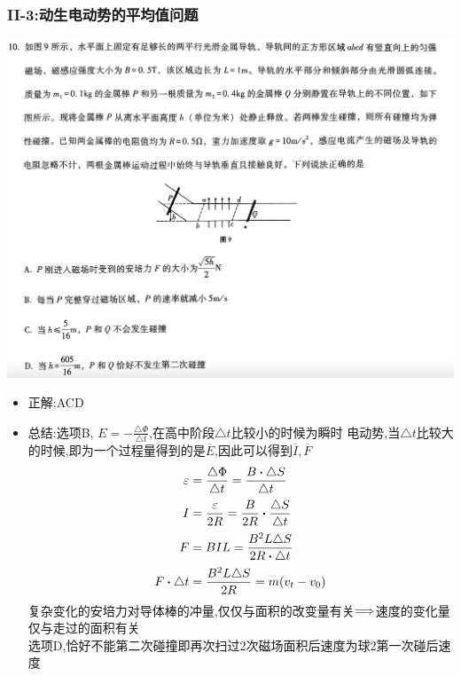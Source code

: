 \documentclass{article}
\begin{document}
\subsubsection{II-3:动生电动势的平均值问题}
\includegraphics[width=50em,keepaspectratio]{./pictures/3.1-3.png}

\begin{itemize}
    \item 正解:\quad ACD
    \item 总结:\quad 选项B, $E = - \frac{\triangle \Phi}{\triangle t}$,在高中阶段$\triangle t$比较小的时候为瞬时
          电动势,当$\triangle t$比较大的时候,即为一个过程量得到的是$\overline{E}$,因此可以得到$\overline{I},\overline{F}$
          \begin{align*}
              \varepsilon         & = \frac{\triangle \Phi}{\triangle t} = \frac{B \vdot \triangle S}{\triangle t} \\
              I                   & = \frac{\varepsilon}{2R} = \frac{B}{2R} \vdot \frac{\triangle S}{\triangle t}  \\
              F                   & = B I L = \frac{B^{2}L \triangle S}{2R \vdot \triangle t}                      \\
              F \vdot \triangle t & = \frac{B^{2} L \triangle S}{2 R} = m(v_{t} - v_{0})
          \end{align*}
          复杂变化的安培力对导体棒的冲量,仅仅与面积的改变量有关$\Longrightarrow$速度的变化量仅与走过的面积有关 \\
          选项D,恰好不能第二次碰撞即再次扫过2次磁场面积后速度为球2第一次碰后速度
\end{itemize}
\end{document}

